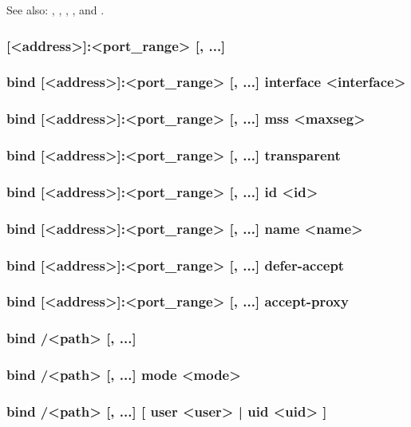 See also: , , , ,
    and .

\subsubsection[bind]{ [<address>]:<port\_range> [, ...]}
\subsubsection*{bind [<address>]:<port\_range> [, ...] interface <interface>}
\subsubsection*{bind [<address>]:<port\_range> [, ...] mss <maxseg>}
\subsubsection*{bind [<address>]:<port\_range> [, ...] transparent}
\subsubsection*{bind [<address>]:<port\_range> [, ...] id <id>}
\subsubsection*{bind [<address>]:<port\_range> [, ...] name <name>}
\subsubsection*{bind [<address>]:<port\_range> [, ...] defer-accept}
\subsubsection*{bind [<address>]:<port\_range> [, ...] accept-proxy}
\subsubsection*{bind /<path> [, ...]}
\subsubsection*{bind /<path> [, ...] mode <mode>}
\subsubsection*{bind /<path> [, ...] [ user <user> | uid <uid> ]}
